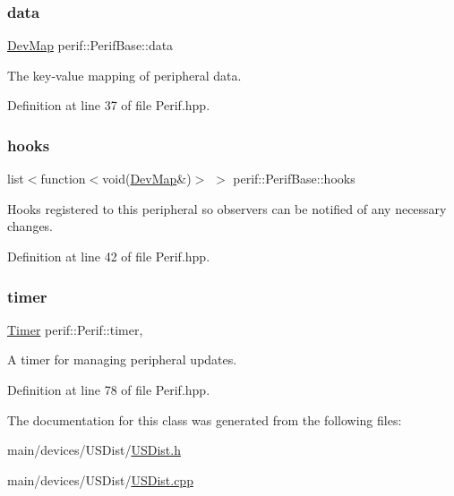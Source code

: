 \subsubsection{\texorpdfstring{data}{data}}
{\footnotesize\ttfamily \mbox{\hyperlink{Perif_8hpp_a358ff4ee6d24694ee7661f0cce14377e}{Dev\+Map}} perif\+::\+Perif\+Base\+::data\hspace{0.3cm}{\ttfamily [inherited]}}

The key-\/value mapping of peripheral data. 

Definition at line 37 of file Perif.\+hpp.

\mbox{\label{classperif_1_1PerifBase_a98964e5ca8384df64881265e0aa6d7b6}} 
\subsubsection{\texorpdfstring{hooks}{hooks}}
{\footnotesize\ttfamily list$<$function$<$void(\mbox{\hyperlink{Perif_8hpp_a358ff4ee6d24694ee7661f0cce14377e}{Dev\+Map}}\&)$>$ $>$ perif\+::\+Perif\+Base\+::hooks\hspace{0.3cm}{\ttfamily [inherited]}}

Hooks registered to this peripheral so observers can be notified of any necessary changes. 

Definition at line 42 of file Perif.\+hpp.

\mbox{\label{classperif_1_1Perif_acfa1256201bead82ccce1a0a8bcc24e1}} 
\subsubsection{\texorpdfstring{timer}{timer}}
{\footnotesize\ttfamily \mbox{\hyperlink{classTimer}{Timer}} perif\+::\+Perif\+::timer\hspace{0.3cm}{\ttfamily [protected]}, {\ttfamily [inherited]}}

A timer for managing peripheral updates. 

Definition at line 78 of file Perif.\+hpp.



The documentation for this class was generated from the following files\+:\begin{DoxyCompactItemize}
\item 
main/devices/\+U\+S\+Dist/\mbox{\hyperlink{USDist_8h}{U\+S\+Dist.\+h}}\item 
main/devices/\+U\+S\+Dist/\mbox{\hyperlink{USDist_8cpp}{U\+S\+Dist.\+cpp}}\end{DoxyCompactItemize}
